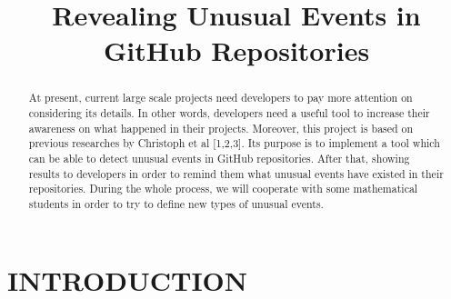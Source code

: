 \documentclass[conference]{IEEEtran}
\begin{document}
\title{Revealing Unusual Events in GitHub Repositories}


\author{
\and
{}
\and
{}
}


\maketitle


\begin{abstract}

At present, current large scale projects need developers to pay more attention on considering its details. In other words, developers need a useful tool to increase their awareness on what happened in their projects. Moreover, this project is based on previous researches by Christoph et al [1,2,3]. Its purpose is to implement a tool which can be able to detect unusual events in GitHub repositories. After that, showing results to developers in order to remind them what unusual events have existed in their repositories. During the whole process, we will cooperate with some mathematical students in order to try to define new types of unusual events. 
\end{abstract}



\section{INTRODUCTION}
\end{document}
